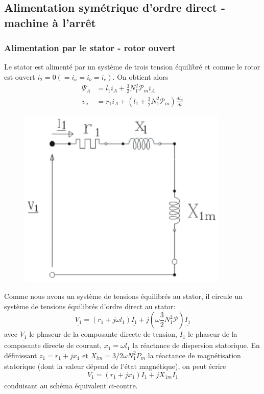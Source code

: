	\subsection{Alimentation symétrique d'ordre direct - machine à l’arrêt}
		\subsubsection{Alimentation par le stator - rotor ouvert}
		Le stator est alimenté par un système de trois tension équilibré et 
		comme le rotor est ouvert $i_2=0 (=i_a=i_b=i_c)$. On obtient alors
		\begin{equation}
		\begin{array}{ll}
		\Psi_A &= l_1i_A + \frac{3}{2}N_1^2\mathcal{P}_mi_A\\
		v_a &= r_1i_A + (l_1+\frac{3}{2}N_1^2\mathcal{P}_m)\frac{di_a}{dt}
		\end{array}
		\end{equation}
					\begin{figure}
	\vspace{-8mm}
	\includegraphics[scale=0.5]{ch5/image17.png}
	\end{figure}
		Comme nous avons un système de tensions équilibrés au stator, il circule
		un système de tensions équilibrés d'ordre direct au stator:
		\begin{equation}
		\underline{V_1} = (r_1+j\omega l_1)\underline{I_1}+j(\omega\frac{3}{2}
		N_1^2\mathcal{P})\underline{I_1}
		\end{equation}
		avec $\underline{V_1}$ le phaseur de la composante directe de tension, 
		$\underline{I_1}$ le phaseur de la composante directe de courant, 
		$x_1=\omega l_1$ la réactance de dispersion statorique. En définissant 
		$\underline{z_1} = r_1+jx_1$ et $X_{lm} = 3/2\omega N_1^2P_m$ la 
		réactance de magnétisation statorique (dont la valeur dépend de l'état 
		magnétique), on peut écrire
		\begin{equation}
		\underline{V_1} = (r_1+jx_1)\underline{I_1}+jX_{1m}\underline{I_1}
		\end{equation}
		conduisant au schéma équivalent ci-contre.\\
		

